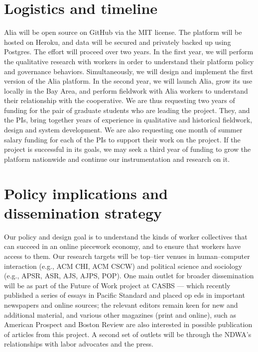 \documentclass[11pt]{article}
\begin{document}
\section*{Logistics and timeline}
Alia will be open source on GitHub via the MIT license.
The platform will be hosted on Heroku, and data will be secured and privately backed up using Postgres.
The effort will proceed over two years.
In the first year, we will perform the qualitative research with workers in order to understand their platform policy and governance behaviors.
Simultaneously, we will design and implement the first version of the Alia platform.
In the second year, we will launch Alia, grow its use locally in the Bay Area, and perform fieldwork with Alia workers to understand their relationship with the cooperative.
We are thus requesting two years of funding for the pair of graduate students who are leading the project.
They, and the PIs, bring together years of experience in qualitative and historical fieldwork, design and system development.
We are also requesting one month of summer salary funding for each of the PIs to support their work on the project.
If the project is successful in its goals, we may seek a third year of funding to grow the platform nationwide and continue our instrumentation and research on it.

\section*{Policy implications and dissemination strategy}
Our policy and design goal is to understand the kinds of worker collectives that can succeed in an online piecework economy, and to ensure that workers have access to them.
Our research targets will be top--tier venues in human--computer interaction
(e.g., ACM CHI, ACM CSCW)
and political science and sociology
(e.g., APSR, ASR, AJS, AJPS, POP).
One main outlet for broader dissemination will be as part of the Future of Work project at CASBS 
--- which recently published a series of essays in Pacific Standard and placed op eds in important newspapers and online sources; the relevant editors remain keen for new and additional material, and various other magazines
(print and online), such as American Prospect and Boston Review are also interested in possible publication of articles from this project.
A second set of outlets will be through the NDWA's relationships with labor advocates and the press.




\end{document}
